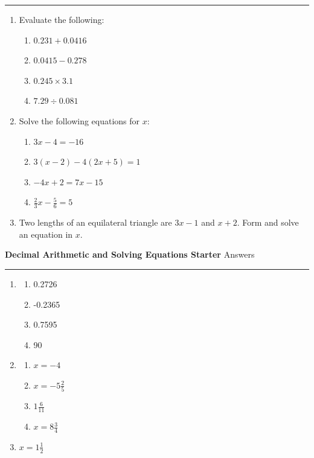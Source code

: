 \documentclass[12pt]{article}
\begin{document}
\hrule

\medskip

\begin{enumerate}
    \item Evaluate the following:
    \begin{enumerate}
        \item \(0.231 + 0.0416\)
        \item \(0.0415 - 0.278\)
        \item \(0.245 \times 3.1\)
        \item \(7.29 \div 0.081\)
    \end{enumerate}
    \item Solve the following equations for \(x\):
    \begin{enumerate}
        \item \(3x-4=-16\)
        \item \(3(x-2)-4(2x+5)=1\)
        \item \(-4x+2 = 7x -15\)
        \item \( \frac{2}{3}x-\frac{5}{6} = 5 \)
    \end{enumerate}
    \item Two lengths of an equilateral triangle are \(3x-1\) and \(x+2\). Form and solve an equation in \(x\).
\end{enumerate}

\newpage

\noindent \textbf{Decimal Arithmetic and Solving Equations Starter} \hfill Answers

\medskip

\hrule 

\medskip

\begin{enumerate}
    \item \begin{enumerate}
        \item 0.2726
        \item -0.2365
        \item 0.7595
        \item 90
    \end{enumerate}
    \item \begin{enumerate}
        \item \(x=-4\)
        \item \(x=-5\frac{2}{5}\)
        \item \(1\frac{6}{11}\)
        \item \(x=8\frac{3}{4}\)
    \end{enumerate}
    \item \(x=1\frac{1}{2}\)
\end{enumerate}
\end{document}
